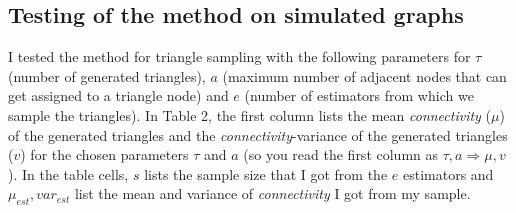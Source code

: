 \documentclass[12pt,twoside,a4paper]{report}
\begin{document}
\subsection{Testing of the method on simulated graphs}
I tested the method for triangle sampling with the following parameters for $\tau$ (number of generated triangles), $a$ (maximum number of adjacent nodes that can get assigned to a triangle node) and $e$ (number of estimators from which we sample the triangles). In Table 2, the first column lists the mean \textit{connectivity} ($\mu$) of the generated triangles and the \textit{connectivity}-variance of the generated triangles ($v$) for the chosen parameters $\tau$ and $a$ (so you read the first column as $\tau, a \Rightarrow \mu, v$). In the table cells, $s$ lists the sample size that I got from the $e$ estimators and 
$\mu_{est}, var_{est}$ list the mean and variance of \textit{connectivity} I got from my sample.
\end{document}
